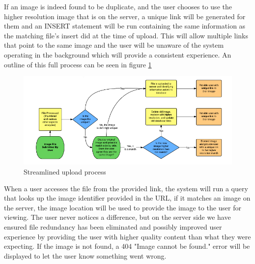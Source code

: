 \documentclass[11pt]{article}
\begin{document}
If an image is indeed found to be duplicate, and the user chooses to use the higher resolution image that is on the server, a unique link will be generated for them and an INSERT statement will be run containing the same information as the matching file's insert did at the time of upload. This will allow multiple links that point to the same image and the user will be unaware of the system operating in the background which will provide a consistent experience. An outline of this full process can be seen in figure \ref{method-fig1}

\begin{figure}[htbp]
\centering
\includegraphics[width=5.8in]{upprocess}
\caption{Streamlined upload process}
\label{method-fig1}
\end{figure}

When a user accesses the file from the provided link, the system will run a query that looks up the image identifier provided in the URL, if it matches an image on the server, the image location will be used to provide the image to the user for viewing. The user never notices a difference, but on the server side we have ensured file redundancy has been eliminated and possibly improved user experience by providing the user with higher quality content than what they were expecting. If the image is not found, a 404 "Image cannot be found." error will be displayed to let the user know something went wrong.

%
%
\end{document}

